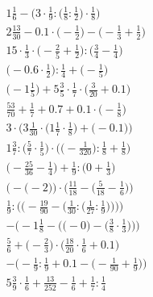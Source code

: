 \documentclass[8pt]{article}
\begin{document}
\begin{align}
1\frac{1}{6} - \Big(3 \cdot \frac{1}{9} : \big(\frac{1}{8} : \frac{1}{2}\big) \cdot \frac{1}{8}\Big) \\
2\frac{13}{30} - 0.1 \cdot \big(-\frac{1}{2}\big) - \big(-\frac{1}{3} + \frac{1}{2}\big) \\
15 \cdot \frac{1}{3} \cdot \big(-\frac{2}{5} + \frac{1}{2}\big) : \big(\frac{3}{4} - \frac{1}{4}\big) \\
\big(-0.6 \cdot \frac{1}{2}\big) : \frac{1}{4} + \big(-\frac{1}{5}\big) \\
\big(-1\frac{1}{5}\big) + 5\frac{3}{5} \cdot \frac{1}{7} \cdot \big(\frac{3}{20} + 0.1\big) \\
\frac{53}{70} + \frac{1}{7} + 0.7 + 0.1 \cdot \big(-\frac{1}{8}\big) \\
3 \cdot \Big(3\frac{1}{30} \cdot \big(1\frac{1}{7} \cdot \frac{1}{8}\big) + \big(-0.1\big)\Big) \\
1\frac{3}{7} : \Big(\frac{5}{7} \cdot \frac{1}{5}\Big) \cdot \Big(\big(-\frac{1}{320}\big) : \frac{1}{8} + \frac{1}{8}\Big) \\
\big(-\frac{25}{36} - \frac{1}{4}\big) + \frac{1}{9} : \big(0 + \frac{1}{3}\big) \\
\Big(-\big(-2\big)\Big) \cdot \Big(\frac{11}{18} - \big(\frac{5}{18} - \frac{1}{6}\big)\Big) \\
\frac{1}{9} : \Bigg(\bigg(-\frac{19}{90} - \Big(\frac{1}{30} : \big(\frac{1}{27} : \frac{1}{9}\big)\Big)\bigg)\Bigg) \\
-\bigg(-1\frac{1}{8} - \Big(\big(-0\big) - \big(\frac{3}{8} \cdot \frac{1}{3}\big)\Big)\bigg) \\
\frac{5}{6} + \big(-\frac{2}{3}\big) \cdot \big(\frac{18}{20} \cdot \frac{1}{6} + 0.1\big) \\
-\Big(-\frac{1}{9} : \frac{1}{9} + 0.1 - \big(-\frac{1}{90} + \frac{1}{9}\big)\Big) \\
5\frac{3}{9} \cdot \frac{1}{6} + \frac{13}{252} - \frac{1}{6} + \frac{1}{7} : \frac{1}{4}
\end{align}
\end{document}
